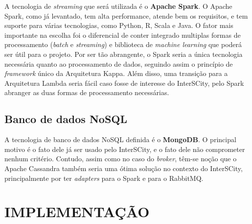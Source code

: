 A tecnologia de \textit{streaming} que será utilizada é o \textbf{Apache Spark}.
O Apache Spark, como já levantado, tem alta performance, atende bem os
requisitos, e tem suporte para várias tecnologias, como Python, R, Scala e
Java. O fator mais importante na escolha foi o diferencial de conter integrado
multiplas formas de processamento (\textit{batch} e \textit{streaming}) e
biblioteca de \textit{machine learning} que poderá ser útil para o projeto.
Por ser tão abrangente, o Spark seria a única tecnologia necessária quanto ao
processamento de dados, seguindo assim o princípio de \textit{framework} único
da Arquitetura Kappa. Além disso, uma transição para a Arquitetura Lambda seria
fácil caso fosse de interesse do InterSCity, pelo Spark abranger as duas formas
de processamento necessárias.

\subsection{Banco de dados NoSQL}

A tecnologia de banco de dados NoSQL definida é o \textbf{MongoDB}. O principal
motivo é o fato dele já ser usado pelo InterSCity, e o fato dele não
comprometer nenhum critério. Contudo, assim como no caso do \textit{broker},
têm-se noção que o Apache Cassandra também seria uma ótima solução no contexto
do InterSCity, principalmente por ter \textit{adapters} para o Spark e para o
RabbitMQ.

\section{IMPLEMENTAÇÃO}


